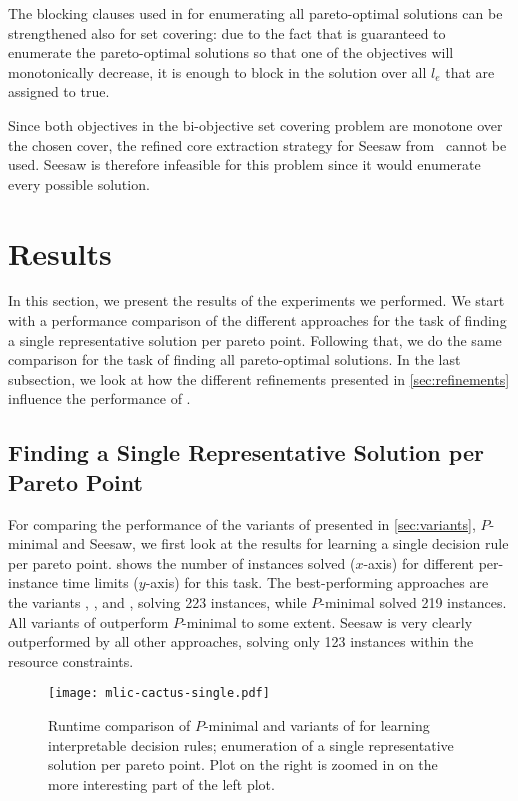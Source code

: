 The blocking clauses used in \algname{} for enumerating all pareto-optimal solutions can be strengthened also for set covering:
due to the fact that \algname{} is guaranteed to enumerate the pareto-optimal solutions so that one of the objectives will monotonically decrease, it is enough to block in \algname{} the solution over all $l_e$ that are assigned to true.

Since both objectives in the bi-objective set covering problem are monotone over the chosen cover, the refined core extraction strategy for Seesaw from~\textcite{DBLP:conf/cp/JanotaMSM21} cannot be used.
Seesaw is therefore infeasible for this problem since it would enumerate every possible solution.

\section{Results\label{sec:results}}

In this section, we present the results of the experiments we performed.
We start with a performance comparison of the different approaches for the task of finding a single representative solution per pareto point.
Following that, we do the same comparison for the task of finding all pareto-optimal solutions.
In the last subsection, we look at how the different refinements presented in \cref{sec:refinements} influence the performance of \algname{}.

\subsection{Finding a Single Representative Solution per Pareto Point}

For comparing the performance of the variants of \algname{} presented in \cref{sec:variants}, $P$-minimal and Seesaw, we first look at the results for learning a single decision rule per pareto point.
 shows the number of instances solved ($x$-axis) for different per-instance time limits ($y$-axis) for this task.
The best-performing approaches are the \algname{} variants \msh{}, \satunsat{}, \unsatsat{} and \msu{}, solving 223 instances, while $P$-minimal solved 219 instances.
All variants of \algname{} outperform $P$-minimal to some extent.
Seesaw is very clearly outperformed by all other approaches, solving only 123 instances within the resource constraints.

\begin{figure}
    \centering
    \texttt{[image: mlic-cactus-single.pdf]}
    \caption{Runtime comparison of $P$-minimal and variants of \algname{} for learning interpretable decision rules;
      enumeration of a single representative solution per pareto point.
      Plot on the right is zoomed in on the more interesting part of the left plot.
    }\label{fig:mlic-cactus-single}
\end{figure}

